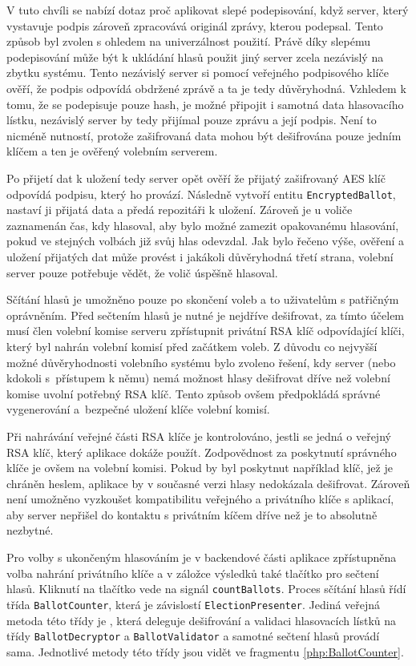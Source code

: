 
V tuto chvíli se nabízí dotaz proč aplikovat slepé podepisování, když server, který vystavuje podpis zároveň zpracovává originál zprávy, kterou podepsal. Tento způsob byl zvolen s ohledem na univerzálnost použití. Právě díky slepému podepisování může být k ukládání hlasů použit jiný server zcela nezávislý na zbytku systému. Tento nezávislý server si pomocí veřejného podpisového klíče ověří, že podpis odpovídá obdržené zprávě a ta je tedy důvěryhodná. Vzhledem k tomu, že se podepisuje pouze hash, je možné připojit i samotná data hlasovacího lístku, nezávislý server by tedy přijímal pouze zprávu a její podpis. Není to nicméně nutností, protože zašifrovaná data mohou být dešifrována pouze jedním klíčem a ten je ověřený volebním serverem.

Po přijetí dat k uložení tedy server opět ověří že přijatý zašifrovaný AES klíč odpovídá podpisu, který ho provází. Následně vytvoří entitu \texttt{EncryptedBallot}, nastaví ji přijatá data a předá repozitáři k uložení. Zároveň je u voliče zaznamenán čas, kdy hlasoval, aby bylo možné zamezit opakovanému hlasování, pokud ve stejných volbách již svůj hlas odevzdal. Jak bylo řečeno výše, ověření a uložení přijatých dat může provést i jakákoli důvěryhodná třetí strana, volební server pouze potřebuje vědět, že volič úspěšně hlasoval.

Sčítání hlasů je umožněno pouze po skončení voleb a to uživatelům s patřičným oprávněním. Před sečtením hlasů je nutné je nejdříve dešifrovat, za tímto účelem musí člen volební komise serveru zpřístupnit privátní RSA klíč odpovídající klíči, který byl nahrán volební komisí před začátkem voleb. Z důvodu co nejvyšší možné důvěryhodnosti volebního systému bylo zvoleno řešení, kdy server (nebo kdokoli s~přístupem k němu) nemá možnost hlasy dešifrovat dříve než volební komise uvolní potřebný RSA klíč. Tento způsob ovšem předpokládá správné vygenerování a~bezpečné uložení klíče volební komisí.

Při nahrávání veřejné části RSA klíče je kontrolováno, jestli se jedná o veřejný RSA klíč, který aplikace dokáže použít. Zodpovědnost za poskytnutí správného klíče je ovšem na volební komisi. Pokud by byl poskytnut například klíč, jež je chráněn heslem, aplikace by v současné verzi hlasy nedokázala dešifrovat. Zároveň není umožněno vyzkoušet kompatibilitu veřejného a privátního klíče s aplikací, aby server nepřišel do kontaktu s privátním kíčem dříve než je to absolutně nezbytné.

Pro volby s ukončeným hlasováním je v backendové části aplikace zpřístupněna volba nahrání privátního klíče a v záložce výsledků také tlačítko pro sečtení hlasů. Kliknutí na tlačítko vede na signál \texttt{countBallots}. Proces sčítání hlasů řídí třída \texttt{BallotCounter}, která je závislostí \texttt{ElectionPresenter}. Jediná veřejná metoda této třídy je %
, která deleguje dešifrování a validaci hlasovacích lístků na třídy \texttt{BallotDecryptor} a \texttt{BallotValidator} a samotné sečtení hlasů provádí sama. Jednotlivé metody této třídy jsou vidět ve fragmentu \ref{php:BallotCounter}.

